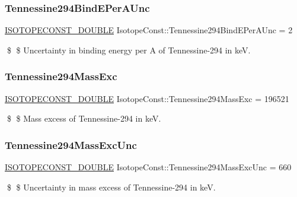 \subsubsection{\texorpdfstring{Tennessine294\+Bind\+E\+Per\+A\+Unc}{Tennessine294BindEPerAUnc}}
{\footnotesize\ttfamily \mbox{\hyperlink{group___isotope_const-_macros_ga8f45a7272ce02c0b4c65c44636ed719a}{I\+S\+O\+T\+O\+P\+E\+C\+O\+N\+S\+T\+\_\+\+D\+O\+U\+B\+LE}} Isotope\+Const\+::\+Tennessine294\+Bind\+E\+Per\+A\+Unc = 2}

\$ \$ Uncertainty in binding energy per A of Tennessine-\/294 in keV. \mbox{\label{group___isotope_const-_tennessine-_ts294_ga55c8af7d2e4ac262d7a3a12a68493d5c}} 
\subsubsection{\texorpdfstring{Tennessine294\+Mass\+Exc}{Tennessine294MassExc}}
{\footnotesize\ttfamily \mbox{\hyperlink{group___isotope_const-_macros_ga8f45a7272ce02c0b4c65c44636ed719a}{I\+S\+O\+T\+O\+P\+E\+C\+O\+N\+S\+T\+\_\+\+D\+O\+U\+B\+LE}} Isotope\+Const\+::\+Tennessine294\+Mass\+Exc = 196521}

\$ \$ Mass excess of Tennessine-\/294 in keV. \mbox{\label{group___isotope_const-_tennessine-_ts294_ga4826fa2e0464e2e672d8a4fed24396bf}} 
\subsubsection{\texorpdfstring{Tennessine294\+Mass\+Exc\+Unc}{Tennessine294MassExcUnc}}
{\footnotesize\ttfamily \mbox{\hyperlink{group___isotope_const-_macros_ga8f45a7272ce02c0b4c65c44636ed719a}{I\+S\+O\+T\+O\+P\+E\+C\+O\+N\+S\+T\+\_\+\+D\+O\+U\+B\+LE}} Isotope\+Const\+::\+Tennessine294\+Mass\+Exc\+Unc = 660}

\$ \$ Uncertainty in mass excess of Tennessine-\/294 in keV. \mbox{\label{group___isotope_const-_tennessine-_ts294_ga113438e0d1b11cec4b9de848f95a7096}} 
